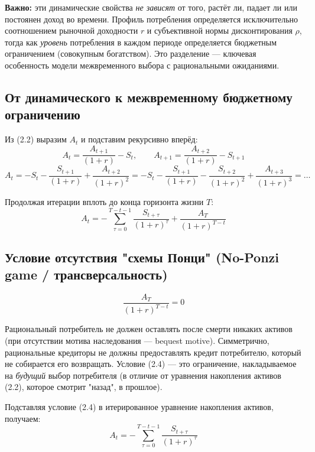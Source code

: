 \documentclass[10pt,a4paper]{article}
\begin{document}
\begin{intuition}
\textbf{Важно:} эти динамические свойства \emph{не зависят} от того, растёт ли, падает ли или постоянен доход во времени. Профиль потребления определяется исключительно соотношением рыночной доходности $r$ и субъективной нормы дисконтирования $\rho$, тогда как \emph{уровень} потребления в каждом периоде определяется бюджетным ограничением (совокупным богатством). Это разделение — ключевая особенность модели межвременного выбора с рациональными ожиданиями.
\end{intuition}
 
\subsection{От динамического к межвременному бюджетному ограничению}
 
Из (2.2) выразим $A_t$ и подставим рекурсивно вперёд:
\[
A_t = \frac{A_{t+1}}{(1+r)} - S_t, \qquad A_{t+1} = \frac{A_{t+2}}{(1+r)} - S_{t+1}
\]
\[
A_t = -S_t - \frac{S_{t+1}}{(1+r)} + \frac{A_{t+2}}{(1+r)^2} = -S_t - \frac{S_{t+1}}{(1+r)} - \frac{S_{t+2}}{(1+r)^2} + \frac{A_{t+3}}{(1+r)^3} = \dots
\]
 
Продолжая итерации вплоть до конца горизонта жизни $T$:
\begin{equation}
A_t = -\sum_{\tau=0}^{T-t-1}\frac{S_{t+\tau}}{(1+r)^\tau} + \frac{A_T}{(1+r)^{T-t}} \tag{в исходной форме}
\end{equation}
 
\subsection{Условие отсутствия "схемы Понци" (No-Ponzi game / трансверсальность)}
 
\begin{equation}
\frac{A_T}{(1+r)^{T-t}} = 0 \tag{2.4}
\end{equation}
 
\begin{intuition}
Рациональный потребитель не должен оставлять после смерти никаких активов (при отсутствии мотива наследования — bequest motive). Симметрично, рациональные кредиторы не должны предоставлять кредит потребителю, который не собирается его возвращать. Условие (2.4) — это ограничение, накладываемое на \emph{будущий} выбор потребителя (в отличие от уравнения накопления активов (2.2), которое смотрит "назад", в прошлое).
\end{intuition}
 
Подставляя условие (2.4) в итерированное уравнение накопления активов, получаем:
\begin{equation}
A_t = -\sum_{\tau=0}^{T-t-1} \frac{S_{t+\tau}}{(1+r)^\tau} \tag{2.5}
\end{equation}
 
\end{document}
